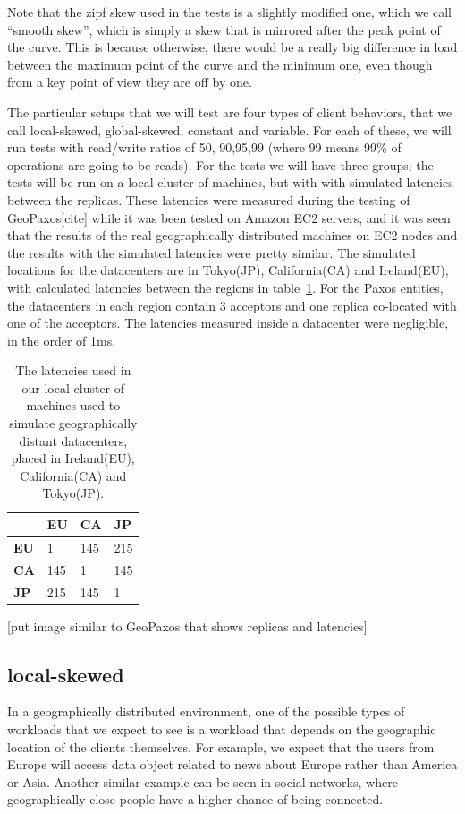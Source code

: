 Note that the zipf skew used in the tests is a slightly modified one, which we call ``smooth skew'', which is simply a skew that is mirrored after the peak point of the curve. This is because otherwise, there would be a really big difference in load between the maximum point of the curve and the minimum one, even though from a key point of view they are off by one.

The particular setups that we will test are four types of client behaviors, that we call local-skewed, global-skewed, constant and variable. For each of these, we will run tests with read/write ratios of 50, 90,95,99 (where 99 means 99\% of operations are going to be reads). For the tests we will have three groups; the tests will be run on a local cluster of machines, but with with simulated latencies between the replicas. These latencies were measured during the testing of GeoPaxos[cite] while it was been tested on Amazon EC2 servers, and it was seen that the results of the real geographically distributed machines on EC2 nodes and the results with the simulated latencies were pretty similar. The simulated locations for the datacenters are in Tokyo(JP), California(CA) and Ireland(EU), with calculated latencies between the regions in table~\ref{tab:latencies}. For the Paxos entities, the datacenters in each region contain 3 acceptors and one replica co-located with one of the acceptors. The latencies measured inside a datacenter were negligible, in the order of 1ms.


\begin{table}[!htb]
  \centering
  \begin{tabular}{l l l l}
    \hline
    & \textbf{EU} & \textbf{CA} & \textbf{JP} \\
    \hline
    \textbf{EU} & 1 & 145 & 215 \\
    \textbf{CA} & 145 & 1 & 145 \\
    \textbf{JP} & 215 & 145 & 1 \\
    \hline
  \end{tabular}
  \caption{The latencies used in our local cluster of machines used to simulate geographically distant datacenters, placed in Ireland(EU), California(CA) and Tokyo(JP).}\label{tab:latencies}
\end{table}

[put image similar to GeoPaxos that shows replicas and latencies]


\subsection{local-skewed}\label{sec:local-skewed}
In a geographically distributed environment, one of the possible types of workloads that we expect to see is a workload that depends on the geographic location of the clients themselves. For example, we expect that the users from Europe will access data object related to news about Europe rather than America or Asia. Another similar example can be seen in social networks, where geographically close people have a higher chance of being connected.

